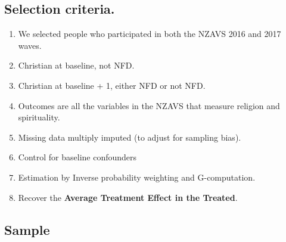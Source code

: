 \documentclass[
  singlecolumn]{report}
\providecommand{\tightlist}{%
  \setlength{\itemsep}{0pt}\setlength{\parskip}{0pt}}\usepackage{longtable,booktabs,array}
\begin{document}
\hypertarget{selection-criteria.}{%
\subsection{Selection criteria.}\label{selection-criteria.}}

\begin{enumerate}
\def\labelenumi{\arabic{enumi}.}
\tightlist
\item
  We selected people who participated in both the NZAVS 2016 and 2017
  waves.
\item
  Christian at baseline, not NFD.
\item
  Christian at baseline + 1, either NFD or not NFD.
\item
  Outcomes are all the variables in the NZAVS that measure religion and
  spirituality.
\item
  Missing data multiply imputed (to adjust for sampling bias).
\item
  Control for baseline confounders
\item
  Estimation by Inverse probability weighting and G-computation.
\item
  Recover the \textbf{Average Treatment Effect in the Treated}.
\end{enumerate}

\hypertarget{sample}{%
\subsection{Sample}\label{sample}}
\end{document}
